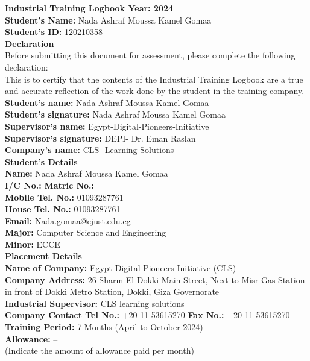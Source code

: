 \documentclass[12pt,a4paper]{article}
\begin{document}
{\LARGE \textbf{Industrial Training Logbook Year: 2024}}\\[6pt]

\textbf{Student's Name:} Nada Ashraf Moussa Kamel Gomaa\\
\textbf{Student's ID:} 120210358\\[10pt]

{\Large \textbf{Declaration}}\\[6pt]
Before submitting this document for assessment, please complete the following declaration:\\[6pt]

This is to certify that the contents of the Industrial Training Logbook are a true and accurate reflection of the work done by the student in the training company.\\[10pt]

\textbf{Student's name:} Nada Ashraf Moussa Kamel Gomaa\\
\textbf{Student's signature:} Nada Ashraf Moussa Kamel Gomaa\\
\textbf{Supervisor's name:} Egypt-Digital-Pioneers-Initiative\\
\textbf{Supervisor's signature:} DEPI- Dr. Eman Raslan\\
\textbf{Company's name:} CLS- Learning Solutions\\[14pt]

{\Large \textbf{Student's Details}}\\[6pt]
\textbf{Name:} Nada Ashraf Moussa Kamel Gomaa\\
\textbf{I/C No.:} \hspace{2cm} \textbf{Matric No.:}\\
\textbf{Mobile Tel. No.:} 01093287761\\
\textbf{House Tel. No.:} 01093287761\\
\textbf{Email:} \href{mailto:Nada.gomaa@ejust.edu.eg}{Nada.gomaa@ejust.edu.eg}\\
\textbf{Major:} Computer Science and Engineering\\
\textbf{Minor:} ECCE\\[14pt]

{\Large \textbf{Placement Details}}\\[6pt]
\textbf{Name of Company:} Egypt Digital Pioneers Initiative (CLS)\\
\textbf{Company Address:} 26 Sharm El-Dokki Main Street, Next to Misr Gas Station in front of Dokki Metro Station, Dokki, Giza Governorate\\
\textbf{Industrial Supervisor:} CLS learning solutions\\
\textbf{Company Contact Tel No.:} +20 11 53615270 \hspace{1.2cm} \textbf{Fax No.:} +20 11 53615270\\
\textbf{Training Period:} 7 Months (April to October 2024)\\
\textbf{Allowance:} --\\
(Indicate the amount of allowance paid per month)\\[18pt]
\end{document}
